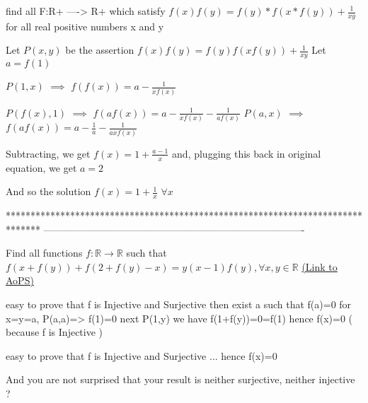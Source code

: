 \begin{solution}
	\begin{tcolorbox}find all F:R+ ----> R+ which satisfy $f(x)f(y) = f(y)*f(x*f(y)) +\frac{1}{xy}$ for all real positive numbers x and y\end{tcolorbox}
Let $P(x,y)$ be the assertion $f(x)f(y)=f(y)f(xf(y))+\frac 1{xy}$
Let $a=f(1)$

$P(1,x)$ $\implies$ $f(f(x))=a-\frac 1{xf(x)}$

$P(f(x),1)$ $\implies$ $f(af(x))=a-\frac 1{xf(x)}-\frac 1{af(x)}$
$P(a,x)$ $\implies$ $f(af(x))=a-\frac 1{a}-\frac 1{axf(x)}$

Subtracting, we get $f(x)=1+\frac{a-1}x$ and, plugging this back in original equation, we get $a=2$

And so the solution $\boxed{f(x)=1+\frac 1x}$ $\forall x$
\end{solution}
*******************************************************************************
-------------------------------------------------------------------------------

\begin{problem}
	Find all functions $f:\mathbb{R} \to \mathbb{R}$ such that
$ f(x+f(y))+f(2+f(y)-x)=y(x-1)f(y), \forall x,y \in \mathbb{R} $
	\flushright \href{https://artofproblemsolving.com/community/c6h604132}{(Link to AoPS)}
\end{problem}



\begin{solution}
	easy to prove that f is Injective and Surjective
then exist a such that f(a)=0 
for x=y=a, P(a,a)=> f(1)=0 
next P(1,y) we have f(1+f(y))=0=f(1) hence f(x)=0 ( because f is Injective )
\end{solution}



\begin{solution}
	\begin{tcolorbox}easy to prove that f is Injective and Surjective
...
 hence f(x)=0\end{tcolorbox}
And you are not surprised that your result is neither surjective, neither injective ?
\end{solution}



